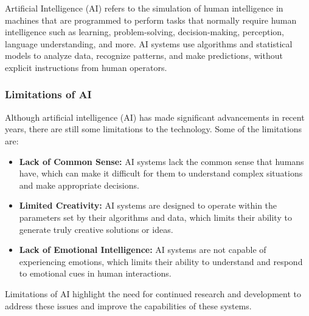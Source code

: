 Artificial Intelligence (AI) refers to the simulation of human intelligence in machines that are programmed to perform tasks that normally require human intelligence such as learning, problem-solving, decision-making, perception, language understanding, and more\cite{ISSN-2456-2165}. AI systems use algorithms and statistical models to analyze data, recognize patterns, and make predictions, without explicit instructions from human operators.

\subsubsection{Limitations of AI}
Although artificial intelligence (AI) has made significant advancements in recent years, there are still some limitations to the technology. Some of the limitations are:
\begin{itemize}
	\item \textbf{Lack of Common Sense:} AI systems lack the common sense that humans have, which can make it difficult for them to understand complex situations and make appropriate decisions.
	\item \textbf{Limited Creativity:} AI systems are designed to operate within the parameters set by their algorithms and data, which limits their ability to generate truly creative solutions or ideas.
	\item \textbf{Lack of Emotional Intelligence:} AI systems are not capable of experiencing emotions, which limits their ability to understand and respond to emotional cues in human interactions.
\end{itemize}
Limitations of AI highlight the need for continued research and development to address these issues and improve the capabilities of these systems.
